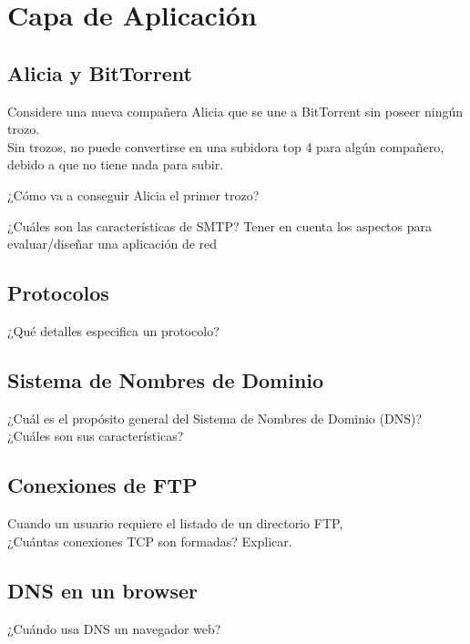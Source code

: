 \documentclass[12pt]{report}
\begin{document}
%
%


\chapter{Capa de Aplicación}

\begin{exer}
	\section{Alicia y BitTorrent \stwo \steo}
	Considere una nueva compañera Alicia que se une a BitTorrent sin poseer ningún trozo.\\ Sin trozos, no puede convertirse en una subidora top 4 para algún compañero, debido a que no tiene nada para subir.

	¿Cómo va a conseguir Alicia el primer trozo?

	¿Cuáles son las características de SMTP? Tener en cuenta los aspectos para
	evaluar/diseñar una aplicación de red
\end{exer}

\section{Protocolos \sthree \steo}
¿Qué detalles especifica un protocolo?

\section{Sistema de Nombres de Dominio \sone \steo}
¿Cuál es el propósito general del Sistema de Nombres de Dominio (DNS)? ¿Cuáles
son sus características?

\section{Conexiones de FTP \stwo \steo}
Cuando un usuario requiere el listado de un directorio FTP,\\ ¿Cuántas conexiones TCP son formadas? Explicar.

\section{DNS en un browser \sone \steo}
¿Cuándo usa DNS un navegador web?
\end{document}
